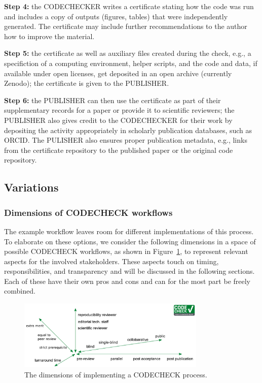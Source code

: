 \documentclass[12pt]{article}
\begin{document}
\textbf{Step 4:} the CODECHECKER writes a certificate stating how the code was
run and includes a copy of outputs (figures, tables) that were
independently generated. The certificate may include further recommendations to
the author how to improve the material.

\textbf{Step 5:} the certificate as well as auxiliary files created during the check,
e.g., a specifiction of a computing environment, helper scripts, and the code and data,
if available under open licenses, get deposited in an open archive (currently Zenodo);
the certificate is given to the PUBLISHER.

\textbf{Step 6:} the PUBLISHER can then use the certificate as part of their
supplementary records for a paper or provide it to scientific reviewers; the
PUBLISHER also gives credit to the CODECHECKER for their work by depositing the
activity appropriately in scholarly publication databases, such as ORCID.
The PULISHER also ensures proper publication metadata, e.g., links from the 
certificate repository to the published paper or the original code repository.

\subsection*{Variations}\label{variations}

\subsubsection*{Dimensions of CODECHECK workflows}\label{dimensions-of-workflows}

The example workflow leaves room for different
implementations of this process. To elaborate on these options, we consider
the following dimensions in a space of possible CODECHECK workflows, as shown in 
Figure~\ref{fig:dimensions}, to represent relevant aspects for the involved
stakeholders. These aspects touch on timing, responsibilities, and 
transparency and will be discussed in the following sections.
Each of these have their own pros and cons and can for the most part be
freely combined.

\begin{figure}
  \centering
      \includegraphics[width=0.8\textwidth]{figs/codecheck_dimensions.pdf}
  \caption{The dimensions of implementing a CODECHECK process.}
  \label{fig:dimensions}
\end{figure}
\end{document}
